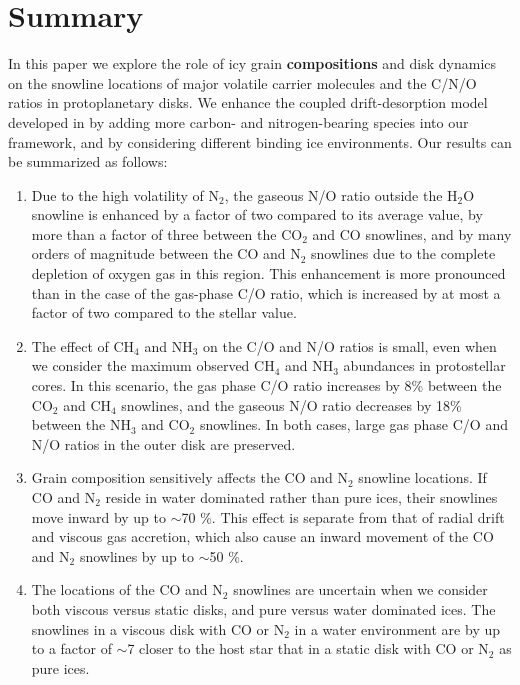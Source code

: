 \documentclass[apj]{emulateapj}
\begin{document}
\section{Summary}
\label{sec:summary}

In this paper we explore the role of icy grain \textbf{compositions} and disk dynamics on the snowline locations of major volatile carrier molecules and the C/N/O ratios in protoplanetary disks. We enhance the coupled drift-desorption model developed in \citet{piso15b} by adding more carbon- and nitrogen-bearing species into our framework, and by considering different binding ice environments. Our results can be summarized as follows:

\begin{enumerate}

\item Due to the high volatility of N$_2$, the gaseous N/O ratio outside the H$_2$O snowline is enhanced by a factor of two compared to its average value, by more than a factor of three between the CO$_2$ and CO snowlines, and by many orders of magnitude between the CO and N$_2$ snowlines due to the complete depletion of oxygen gas in this region. This enhancement is more pronounced than in the case of the gas-phase C/O ratio, which is increased by at most a factor of two compared to the stellar value. %

\item The effect of CH$_4$ and NH$_3$ on the C/O and N/O ratios is small, even when we consider the maximum observed CH$_4$ and NH$_3$ abundances in protostellar cores. In this scenario, the gas phase C/O ratio increases by 8\% between the CO$_2$ and CH$_4$ snowlines, and  the gaseous N/O ratio decreases by 18\% between the NH$_3$ and CO$_2$ snowlines. In both cases, large gas phase C/O and N/O ratios in the outer disk are preserved.

\item Grain composition sensitively affects the CO and N$_2$ snowline locations. If CO and N$_2$ reside in water dominated rather than pure ices, their snowlines move inward by up to $\sim$70 \%. This effect is separate from that of radial drift and viscous gas accretion, which also cause an inward movement of the CO and N$_2$ snowlines by up to $\sim$50 \%. 

\item The locations of the CO and N$_2$ snowlines are uncertain when we consider both viscous versus static disks, and pure versus water dominated ices. The snowlines in a viscous disk with CO or N$_2$ in a water environment are by up to a factor of $\sim$7 closer to the host star that in a static disk with CO or N$_2$ as pure ices. 

\end{enumerate}
\end{document}

